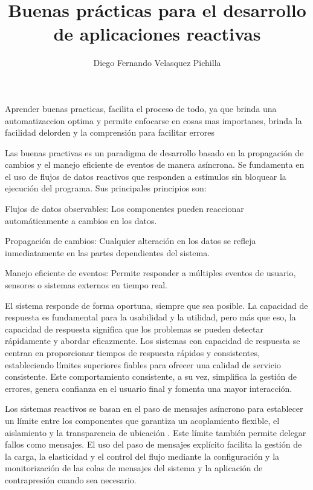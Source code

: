 \documentclass[stu,12pt,floatsintext]{apa7}
\title{Buenas prácticas para el desarrollo de aplicaciones reactivas} %
\author{Diego Fernando Velasquez Pichilla}
\affiliation{Universidad Mariano Gálvez de Guatemala}
\begin{document}
\maketitle %

Aprender buenas practicas, facilita el proceso de todo, ya que brinda una automatizaccion optima y permite enfocarse en cosas mas importanes, brinda la facilidad delorden y la comprensión para facilitar errores 

Las buenas practivas es un paradigma de desarrollo basado en la propagación de cambios y el manejo eficiente de eventos de manera asíncrona. Se fundamenta en el uso de flujos de datos reactivos que responden a estímulos sin bloquear la ejecución del programa. Sus principales principios son:

Flujos de datos observables: Los componentes pueden reaccionar automáticamente a cambios en los datos.

Propagación de cambios: Cualquier alteración en los datos se refleja inmediatamente en las partes dependientes del sistema.

Manejo eficiente de eventos: Permite responder a múltiples eventos de usuario, sensores o sistemas externos en tiempo real.

El sistema responde de forma oportuna, siempre que sea posible. La capacidad de respuesta es fundamental para la usabilidad y la utilidad, pero más que eso, la capacidad de respuesta significa que los problemas se pueden detectar rápidamente y abordar eficazmente. Los sistemas con capacidad de respuesta se centran en proporcionar tiempos de respuesta rápidos y consistentes, estableciendo límites superiores fiables para ofrecer una calidad de servicio consistente. Este comportamiento consistente, a su vez, simplifica la gestión de errores, genera confianza en el usuario final y fomenta una mayor interacción.

 Los sistemas reactivos se basan en el paso de mensajes asíncrono para establecer un límite entre los componentes que garantiza un acoplamiento flexible, el aislamiento y la transparencia de ubicación . Este límite también permite delegar fallos como mensajes. El uso del paso de mensajes explícito facilita la gestión de la carga, la elasticidad y el control del flujo mediante la configuración y la monitorización de las colas de mensajes del sistema y la aplicación de contrapresión cuando sea necesario. 
\end{document}

